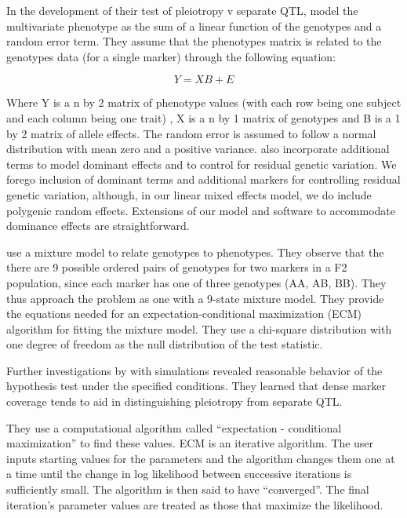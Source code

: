 \documentclass[]{article}\usepackage[]{graphicx}\usepackage[]{color}
\begin{document}
In the development of their test of pleiotropy v separate QTL, \citet{jiang1995multiple} model
the multivariate phenotype as the sum of a linear function of the genotypes and a random error term. They assume that the phenotypes matrix is related to the genotypes data (for a single marker) through the following equation:


\begin{equation}
Y = XB + E
\end{equation}


\noindent Where Y is a n by 2 matrix of phenotype values (with each row being one subject and each column being one trait)
, X is a n by 1 matrix of genotypes and B is a 1 by 2 matrix of allele effects.
The random error is assumed to follow a normal distribution with mean zero and a positive variance.
\citet{jiang1995multiple} also incorporate additional terms to model dominant effects and to
control for residual genetic variation.
We forego inclusion of dominant terms and additional markers for controlling residual
genetic variation, although, in our linear mixed effects model, we do include polygenic random
effects. 
Extensions of our model and software to accommodate dominance effects are straightforward.


\citet{jiang1995multiple} use a mixture model to relate genotypes to phenotypes. 
They observe that the there are 9 possible ordered pairs of genotypes for two markers in a F2 population, since each marker has one of three genotypes (AA, AB, BB).
They thus approach the problem as one with a 9-state mixture model. 
They provide the equations needed for an expectation-conditional maximization
(ECM) algorithm for fitting the mixture model.
They use a chi-square distribution with one degree of freedom as the
null distribution of the test statistic. 

Further investigations by \citet{jiang1995multiple} with simulations revealed
reasonable behavior of the hypothesis test under the specified conditions. 
They learned that dense marker coverage tends to aid in distinguishing pleiotropy
from separate QTL. 










They use a computational algorithm called ``expectation - conditional maximization'' to find these values. 
ECM is an iterative algorithm. 
The user inputs starting values for the parameters and the algorithm changes them one at a
time until the change in log likelihood between successive iterations is sufficiently small.
The algorithm is then said to have ``converged''. 
The final iteration’s parameter values are treated as those that maximize the likelihood.
\end{document}
